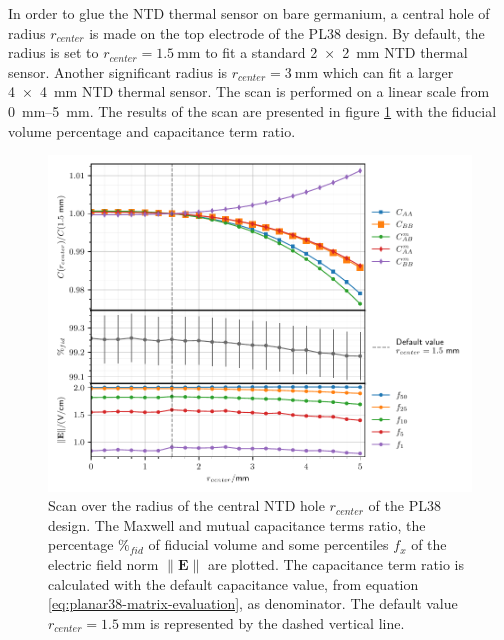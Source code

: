 In order to glue the NTD thermal sensor on bare germanium, a central hole of radius $r_{center}$ is made on the top electrode of the PL38 design. By default, the radius is set to $r_{center} = \SI{1.5}{\mm}$ to fit a standard \SI{2 x 2}{\mm} NTD thermal sensor. Another significant radius is $r_{center}=\SI{3}{\mm}$ which can fit a larger \SI{4 x 4}{\mm} NTD thermal sensor. The scan is performed on a linear scale from \SIrange{0}{5}{\mm}. The results of the scan are presented in figure \ref{fig:capacitance-fiducial-r-center-pl38} with the fiducial volume percentage and capacitance term ratio.

\begin{figure}
\centering
\includegraphics[scale=1]{Figures/ElectrodesScan/capacitance_fiducial_r_center_pl38.pdf}
\caption{Scan over the radius of the central NTD hole $r_{center}$ of the PL38 design. The Maxwell and mutual capacitance terms ratio, the percentage $\%_{fid}$ of fiducial volume and some percentiles $f_x$ of the electric field norm $\| \mathbf{E} \|$ are plotted. The capacitance term ratio is calculated with the default capacitance value, from equation \ref{eq:planar38-matrix-evaluation}, as denominator. The default value $r_{center}=\SI{1.5}{\mm}$ is represented by the dashed vertical line.}
\label{fig:capacitance-fiducial-r-center-pl38}
\end{figure}

